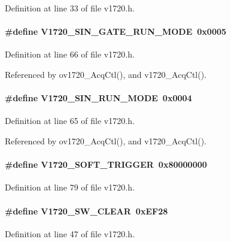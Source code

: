 Definition at line 33 of file v1720.h.
\paragraph[{V1720\_\-SIN\_\-GATE\_\-RUN\_\-MODE}]{\setlength{\rightskip}{0pt plus 5cm}\#define V1720\_\-SIN\_\-GATE\_\-RUN\_\-MODE~0x0005}\hfill\label{v1720_8h_a37f7339140672b71991648f8c0f61682}


Definition at line 66 of file v1720.h.

Referenced by ov1720\_\-AcqCtl(), and v1720\_\-AcqCtl().
\paragraph[{V1720\_\-SIN\_\-RUN\_\-MODE}]{\setlength{\rightskip}{0pt plus 5cm}\#define V1720\_\-SIN\_\-RUN\_\-MODE~0x0004}\hfill\label{v1720_8h_ae86bb66fbe8693d0a4db982c71406072}


Definition at line 65 of file v1720.h.

Referenced by ov1720\_\-AcqCtl(), and v1720\_\-AcqCtl().
\paragraph[{V1720\_\-SOFT\_\-TRIGGER}]{\setlength{\rightskip}{0pt plus 5cm}\#define V1720\_\-SOFT\_\-TRIGGER~0x80000000}\hfill\label{v1720_8h_a1a90e8edb3c1658097d33f90bbb291b3}


Definition at line 79 of file v1720.h.
\paragraph[{V1720\_\-SW\_\-CLEAR}]{\setlength{\rightskip}{0pt plus 5cm}\#define V1720\_\-SW\_\-CLEAR~0xEF28}\hfill\label{v1720_8h_a81ffaca258cf61e866e703c7948c5829}


Definition at line 47 of file v1720.h.
